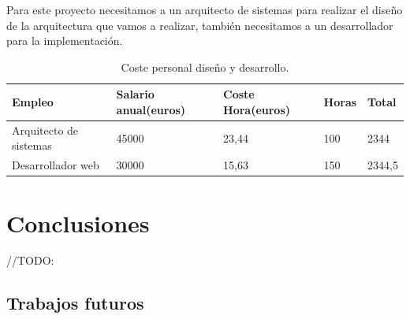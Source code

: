 \documentclass[12pt]{report} %
\begin{document}
Para este proyecto necesitamos a un arquitecto de sistemas para realizar el diseño de la arquitectura que vamos a realizar, también necesitamos a un desarrollador para la implementación.

\begin{table}[H]
	\begin{center}
		\begin{tabular}{|l|l|l|l|l|}
			\hline
			Empleo & Salario anual(euros) & Coste Hora(euros) & Horas & Total \\
			\hline \hline
			Arquitecto de sistemas & 45000 & 23,44 & 100 & 2344 \\ \hline
			Desarrollador web & 30000 & 15,63 & 150 & 2344,5 \\ \hline
		\end{tabular}
		\caption{Coste personal diseño y desarrollo.}
		\label{costePersonal}
	\end{center}
\end{table}

\chapter{Conclusiones}
//TODO:
\section{Trabajos futuros}


\clearpage
{}
\printbibliography




\end{document}
